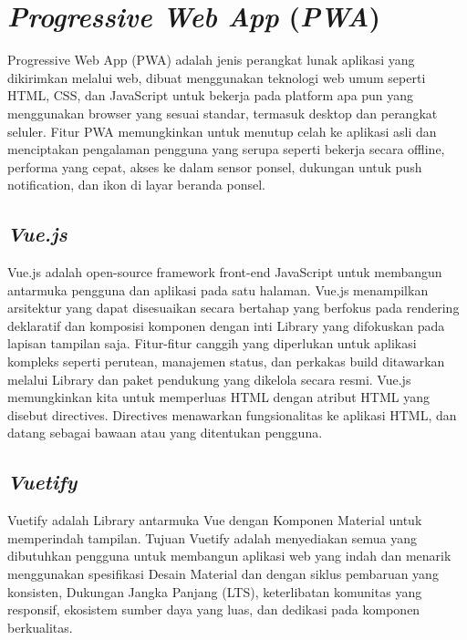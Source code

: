 \section{\emph{Progressive Web App} (\emph{PWA})}
\vspace{1ex}
Progressive Web App (PWA) adalah jenis perangkat lunak aplikasi yang dikirimkan melalui web, dibuat menggunakan 
teknologi web umum seperti HTML, CSS, dan JavaScript untuk bekerja pada platform apa pun yang menggunakan browser 
yang sesuai standar, termasuk desktop dan perangkat seluler.
Fitur PWA memungkinkan untuk menutup celah ke aplikasi asli dan menciptakan pengalaman pengguna yang serupa seperti 
bekerja secara offline, performa yang cepat, akses ke dalam sensor ponsel, dukungan untuk push notification, dan 
ikon di layar beranda ponsel.
\vspace{0.5ex}

\subsection{\emph{Vue.js}}
\vspace{1ex}
Vue.js adalah open-source framework front-end JavaScript untuk membangun antarmuka 
pengguna dan aplikasi pada satu halaman.
Vue.js menampilkan arsitektur yang dapat disesuaikan secara bertahap yang berfokus pada rendering deklaratif dan 
komposisi komponen dengan inti Library yang difokuskan pada lapisan tampilan saja. Fitur-fitur canggih yang 
diperlukan untuk aplikasi kompleks seperti perutean, manajemen status, dan perkakas build ditawarkan melalui 
Library dan paket pendukung yang dikelola secara resmi.
Vue.js memungkinkan kita untuk memperluas HTML dengan atribut HTML yang disebut directives. Directives menawarkan 
fungsionalitas ke aplikasi HTML, dan datang sebagai bawaan atau yang ditentukan pengguna.
\vspace{0.5ex}

\subsection{\emph{Vuetify}}
\vspace{1ex}
Vuetify adalah Library antarmuka Vue dengan Komponen Material untuk memperindah tampilan. 
Tujuan Vuetify adalah menyediakan semua yang dibutuhkan pengguna untuk membangun aplikasi web yang indah dan 
menarik menggunakan spesifikasi Desain Material dan dengan siklus pembaruan yang konsisten, 
Dukungan Jangka Panjang (LTS), keterlibatan komunitas yang responsif, ekosistem sumber daya yang luas, 
dan dedikasi pada komponen berkualitas.
\vspace{0.5ex}